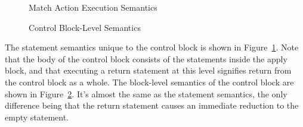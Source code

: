 \documentclass[UTF8]{article}
\begin{document}
\begin{figure}[ht!]
\ottusedrule{\ottdrulestmtXXapplyXXtableXXe{}}
\ottusedrule{\ottdrulestmtXXapplyXXtableXXv{}}
\caption{Match Action Execution Semantics}
\label{fig:semmatchaction}
\end{figure}

\begin{figure}[ht!]
\ottdefnsctrlXXsem
\caption{Control Block-Level Semantics}
\label{fig:semctrl}
\end{figure}

The statement semantics unique to the control block is shown in Figure~\ref{fig:semmatchaction}. Note that the body of the control block consists of the statements inside the apply block, and that executing a return statement at this level signifies return from the control block as a whole. The block-level semantics of the control block are shown in Figure~\ref{fig:semctrl}. It's almost the same as the statement semantics, the only difference being that the return statement causes an immediate reduction to the empty statement.

\newcommand{\actx}{\ensuremath{\mathit{ctx}_\mathit{A}}}
\newcommand{\abl}{\ensuremath{\overline{ab}}}
\newcommand{\pbm}{\ensuremath{B_p}}
\newcommand{\ffbm}{\ensuremath{B_{ \mathit{ff}}}}
\newcommand{\aenv}{\ensuremath{\mathit{env}_\mathit{A}}}
\end{document}
